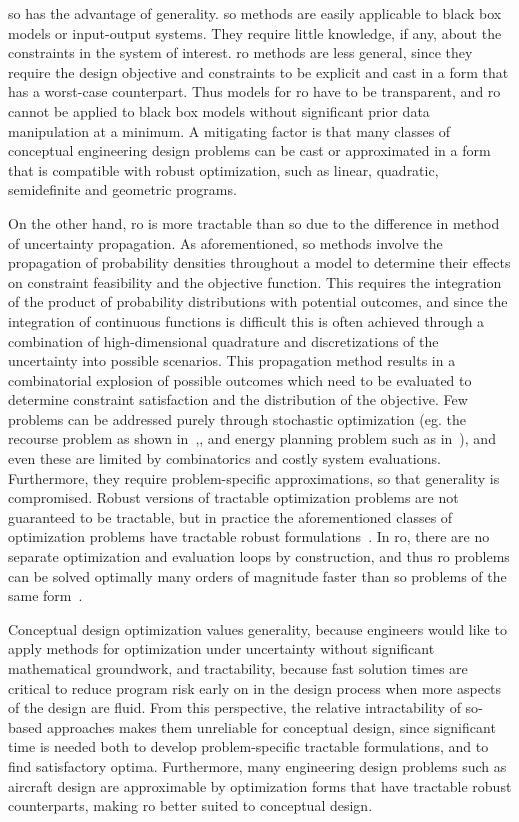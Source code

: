 \gls{so} has the advantage of generality.
\gls{so} methods are easily applicable to black box models or input-output systems.
They require little knowledge, if any, about the constraints in the system of interest.
\gls{ro} methods are less general, since they require
the design objective and constraints to be explicit and cast in a form that has a worst-case
counterpart. Thus models for \gls{ro} have to be transparent,
and \gls{ro} cannot be applied to black box models without significant prior data
manipulation at a minimum. A mitigating factor is that
many classes of conceptual engineering design problems can be cast or approximated in a form that
is compatible with robust optimization, such as linear, quadratic, semidefinite
and geometric programs.

On the other hand, \gls{ro} is more tractable than \gls{so} due to the difference in method of uncertainty propagation.
As aforementioned, \gls{so} methods involve the propagation of probability densities throughout a model
to determine their effects on constraint feasibility and the objective function.
This requires the integration of the product of probability distributions with potential outcomes,
and since the integration of continuous functions is difficult this is often achieved through
a combination of high-dimensional quadrature and discretizations of the uncertainty into
possible scenarios. This propagation method
results in a combinatorial explosion of possible outcomes which need to be evaluated to determine constraint
satisfaction and the distribution of the objective. Few problems can be addressed purely
through stochastic optimization (eg. the recourse problem as
shown in~\cite{Kall1982},\cite{Higle1991}, and energy planning problem such as in~\cite{Pereira1991}), and
even these are limited by combinatorics and costly system evaluations. Furthermore, they require
problem-specific approximations, so that generality is compromised.
Robust versions of tractable optimization problems are not
guaranteed to be tractable, but in practice the aforementioned classes of optimization problems
have tractable robust formulations~\cite{Bertsimas2011}. In \gls{ro},
there are no separate optimization and evaluation
loops by construction, and thus \gls{ro} problems can be solved optimally
many orders of magnitude faster than \gls{so} problems of the same form~\cite{Bertsimas2011}.

Conceptual design optimization values generality, because engineers would like to
apply methods for optimization under uncertainty without significant mathematical groundwork,
and tractability, because fast solution times are critical
to reduce program risk early on in the design process when more aspects
of the design are fluid. From this perspective, the relative intractability of
\gls{so}-based approaches makes them unreliable for conceptual design, since significant time is
needed both to develop problem-specific tractable formulations, and to find satisfactory optima.
Furthermore,
many engineering design problems such as aircraft design are approximable by optimization
forms that have tractable robust counterparts, making \gls{ro} better suited
to conceptual design.

